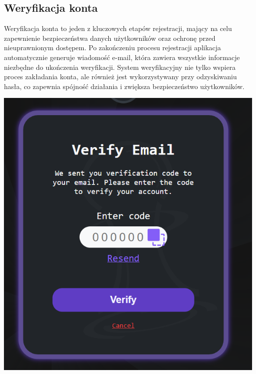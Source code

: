 \documentclass[12pt,a4paper]{article}
\begin{document}
\newpage
\subsection{Weryfikacja konta}

\begin{minipage}[t]{0.45\textwidth} 
    \vspace{0pt} 
    \raggedright Weryfikacja konta to jeden z kluczowych etapów rejestracji, mający na celu zapewnienie bezpieczeństwa danych użytkowników oraz ochronę przed nieuprawnionym dostępem. Po zakończeniu procesu rejestracji aplikacja automatycznie generuje wiadomość e-mail, która zawiera wszystkie informacje niezbędne do ukończenia weryfikacji. System weryfikacyjny nie tylko wspiera proces zakładania konta, ale również jest wykorzystywany przy odzyskiwaniu hasła, co zapewnia spójność działania i zwiększa bezpieczeństwo użytkowników. 
\end{minipage} 
\hfill 
\begin{minipage}[t]{0.45\textwidth} 
    \vspace{0pt} 
    \centering 
    \includegraphics[width=\linewidth]{zdj/ins_min_ver.png} 
\end{minipage}
\end{document}
